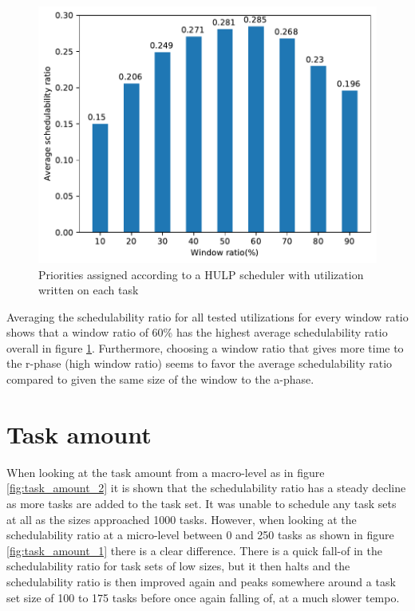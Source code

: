 \documentclass{kththesis}
\begin{document}
\begin{figure}

    \centering

    \includegraphics[width=0.8\linewidth]{images/window_ratio_averages.pdf}

    \caption{Priorities assigned according to a HULP scheduler with utilization written on each task}

    \label{fig:window_ratio_averages}

\end{figure}

Averaging the schedulability ratio for all tested utilizations for every window ratio shows that a
window ratio of 60\% has the highest average schedulability ratio overall in figure
\ref{fig:window_ratio_averages}. Furthermore, choosing a window ratio that gives more time to the
\acrshort{r}-phase (high window ratio) seems to favor the average schedulability ratio compared to
given the same size of the window to the \acrshort{a}-phase.

\section{Task amount} \label{sec:task_amount}
When looking at the task amount from a macro-level as in figure \ref{fig:task_amount_2} it is shown
that the schedulability ratio has a steady decline as more tasks are added to the task set. It was
unable to schedule any task sets at all as the sizes approached 1000 tasks. However, when looking at
the schedulability ratio at a micro-level between 0 and 250 tasks as shown in figure
\ref{fig:task_amount_1} there is a clear difference. There is a quick fall-of in the schedulability
ratio for task sets of low sizes, but it then halts and the schedulability ratio is then improved
again and peaks somewhere around a task set size of 100 to 175 tasks before once again falling of,
at a much slower tempo.
\end{document}
